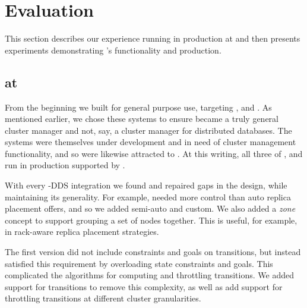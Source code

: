 \section{Evaluation}
\label{sec:eval}
%
This section describes our experience running \helix in production at \linkedin and
then presents experiments demonstrating \helix's functionality and production.

\subsection{\helix at \linkedin}
\label{sec:production}
%
From the beginning we built \helix for general purpose use, targeting \ES, \seas
and \databus.  As mentioned earlier, we chose these systems
to ensure \helix became a truly general cluster manager and not, say, a
cluster manager for distributed databases. 
The systems were themselves under development and in need of cluster management
functionality, and so were likewise attracted to \helix.
At this writing, all three of \ES, \seas and \databus run in production
supported by \helix.

With every \helix-DDS integration we found and repaired gaps in the \helix
design, while maintaining its generality.  For example, \seas needed more
control than auto replica placement offers, and so we added semi-auto and
custom.  
We also added a \emph{zone} concept to support grouping a set of
nodes together.  This is useful, for example, in rack-aware replica placement
strategies.  

The first \helix version did not include constraints and goals on transitions, but instead
satisfied this requirement by overloading state constraints and goals.  This complicated
the algorithms for computing and throttling transitions.  We added support for
transitions to remove this complexity, as well as add support for throttling
transitions at different cluster granularities.



